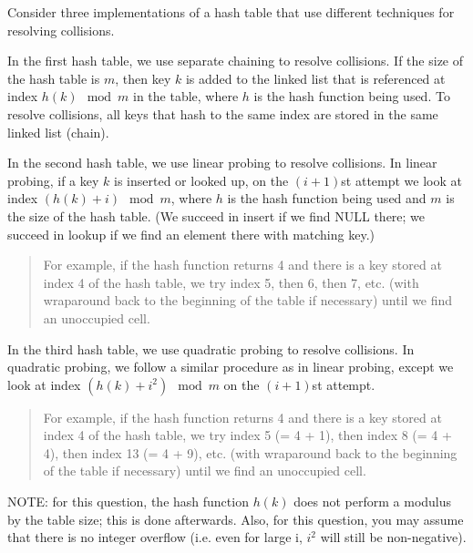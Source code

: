 \documentclass[12pt]{exam}
\begin{document}
\newpage
\begin{questions}



Consider three implementations of a hash table that use different techniques
for resolving collisions.

In the first hash table, we use separate chaining to resolve collisions.
If the size of the hash table is $m$, then key $k$ is added to the linked
list that is referenced at index $h(k) \mod m$ in the table, where $h$ is the hash function
being used. To resolve collisions, all keys that
hash to the same index are stored in the same linked list (chain).

In the second hash table, we use linear probing to resolve collisions.
In linear probing, if a key $k$ is inserted or looked up, on
the $(i+1)$st attempt we look at index $(h(k) + i) \mod m$, where $h$
is the hash function being used and $m$ is the size of the hash table. (We
succeed in insert if we find NULL there; we succeed in lookup if we
find an element there with matching key.)

\begin{quote}
For example, if the hash function returns 4 and there is a key stored at index 4
of the hash table, we try index 5, then 6, then 7, etc. (with wraparound
back to the beginning of the table if necessary) until we find an unoccupied cell.
\end{quote}

In the third hash table, we use quadratic probing to resolve collisions.
In quadratic probing, we follow a similar procedure as in linear probing,
except we look at index $(h(k) + i^2) \mod m$ on the $(i+1)$st attempt.

\begin{quote}
For example, if the hash function returns 4 and there is a key stored at index 4
of the hash table, we try index 5 (= 4 + 1), then index 8 (= 4 + 4), then index 13 (= 4 + 9), etc. (with wraparound
back to the beginning of the table if necessary) until we find an unoccupied cell.
\end{quote}

NOTE: for this question, the hash function $h(k)$ does not perform
a modulus by the table size; this is done afterwards.  Also, for this question, you may assume
that there is no integer overflow (i.e. even for large i, $i^2$ will
still be non-negative).

\vspace{0.5in}
    \begin{parts}


\end{parts}
\end{questions}
\end{document}
